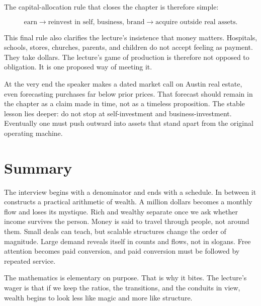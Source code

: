 The capital-allocation rule that closes the chapter is therefore simple:

\begin{equation}
\text{earn} \to \text{reinvest in self, business, brand} \to \text{acquire outside real assets}.
\end{equation}

This final rule also clarifies the lecture's insistence that money matters. Hospitals, schools, stores, churches, parents, and children do not accept feeling as payment. They take dollars. The lecture's game of production is therefore not opposed to obligation. It is one proposed way of meeting it.

At the very end the speaker makes a dated market call on Austin real estate, even forecasting purchases far below prior prices. That forecast should remain in the chapter as a claim made in time, not as a timeless proposition. The stable lesson lies deeper: do not stop at self-investment and business-investment. Eventually one must push outward into assets that stand apart from the original operating machine.

\section{Summary}

The interview begins with a denominator and ends with a schedule. In between it constructs a practical arithmetic of wealth. A million dollars becomes a monthly flow and loses its mystique. Rich and wealthy separate once we ask whether income survives the person. Money is said to travel through people, not around them. Small deals can teach, but scalable structures change the order of magnitude. Large demand reveals itself in counts and flows, not in slogans. Free attention becomes paid conversion, and paid conversion must be followed by repeated service.

The mathematics is elementary on purpose. That is why it bites. The lecture's wager is that if we keep the ratios, the transitions, and the conduits in view, wealth begins to look less like magic and more like structure.